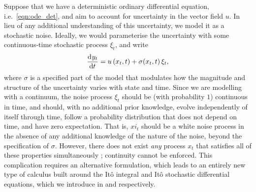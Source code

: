 Suppose that we have a deterministic ordinary differential equation, i.e.\ \cref{eqn:ode_det}, and aim to account for uncertainty in the vector field \(u\).
In lieu of any additional understanding of this uncertainty, we model it as a stochastic noise.
Ideally, we would parameterise the uncertainty with some continuous-time stochastic process \(\xi_t\), and write
\begin{equation}\label{eqn:fake_sde}
	\dod{y_t}{t} = u\left(x_t, t\right) + \sigma\!\left(x_t, t\right)\xi_t,
\end{equation}
where \(\sigma\) is a specified part of the model that modulates how the magnitude and structure of the uncertainty varies with state and time.
Since we are modelling with a continuum, the noise process \(\xi_t\) should be (with probability \(1\)) continuous in time, and should, with no additional prior knowledge, evolve independently of itself through time, follow a probability distribution that does not depend on time, and have zero expectation.
That is, \(xi_t\) should be a white noise process in the absence of any additional knowledge of the nature of the noise, beyond the specification of \(\sigma\).
However, there does not exist \emph{any} process \(x_t\) that satisfies all of these properties simultaneously \citep{Oksendal_2003_StochasticDifferentialEquations}; continuity cannot be enforced.
This complication requires an alternative formulation, which leads to an entirely new type of calculus built around the It\^o integral and It\^o stochastic differential equations, which we introduce in  and  respectively.


